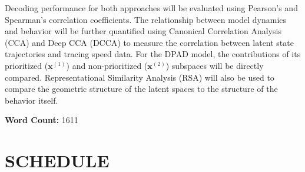 \documentclass[12pt, a4paper]{article}
\begin{document}
Decoding performance for both approaches will be evaluated using Pearson's and Spearman’s correlation coefficients. The relationship between model dynamics and behavior will be further quantified using Canonical Correlation Analysis (CCA) and Deep CCA (DCCA) to measure the correlation between latent state trajectories and tracing speed data. For the DPAD model, the contributions of its prioritized ($\mathbf{x}^{(1)}$) and non-prioritized ($\mathbf{x}^{(2)}$) subspaces will be directly compared. Representational Similarity Analysis (RSA) will also be used to compare the geometric structure of the latent spaces to the structure of the behavior itself.

\vspace{1em}
\noindent\textbf{Word Count:} 1611
\newpage
\section{SCHEDULE}
\end{document}
